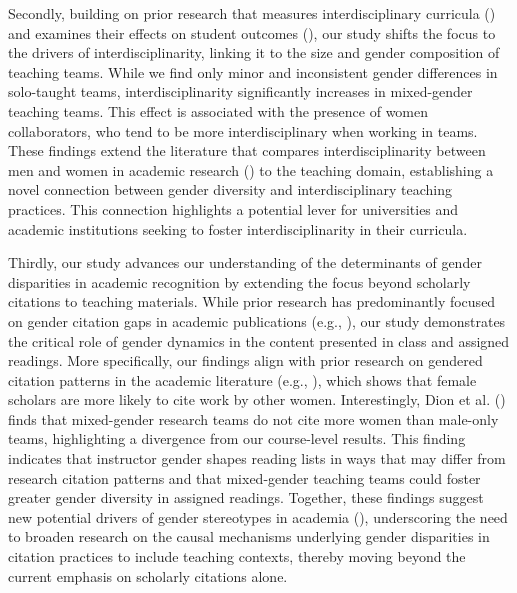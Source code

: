 \documentclass[
  11pt,
]{article}
\begin{document}
Secondly, building on prior research that measures interdisciplinary curricula () and examines their effects on student outcomes (), our study shifts the focus to the drivers of interdisciplinarity, linking it to the size and gender composition of teaching teams. While we find only minor and inconsistent gender differences in solo-taught teams, interdisciplinarity significantly increases in mixed-gender teaching teams. This effect is associated with the presence of women collaborators, who tend to be more interdisciplinary when working in teams. These findings extend the literature that compares interdisciplinarity between men and women in academic research () to the teaching domain, establishing a novel connection between gender diversity and interdisciplinary teaching practices. This connection highlights a potential lever for universities and academic institutions seeking to foster interdisciplinarity in their curricula.

Thirdly, our study advances our understanding of the determinants of gender disparities in academic recognition by extending the focus beyond scholarly citations to teaching materials. While prior research has predominantly focused on gender citation gaps in academic publications (e.g., ), our study demonstrates the critical role of gender dynamics in the content presented in class and assigned readings. More specifically, our findings align with prior research on gendered citation patterns in the academic literature (e.g., ), which shows that female scholars are more likely to cite work by other women. Interestingly, Dion et al. () finds that mixed-gender research teams do not cite more women than male-only teams, highlighting a divergence from our course-level results. This finding indicates that instructor gender shapes reading lists in ways that may differ from research citation patterns and that mixed-gender teaching teams could foster greater gender diversity in assigned readings. Together, these findings suggest new potential drivers of gender stereotypes in academia (), underscoring the need to broaden research on the causal mechanisms underlying gender disparities in citation practices to include teaching contexts, thereby moving beyond the current emphasis on scholarly citations alone.
\end{document}
